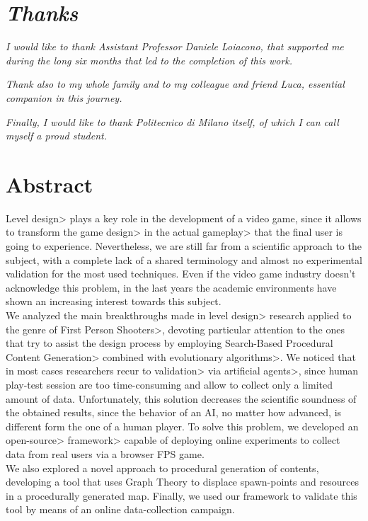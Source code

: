 \chapter{\textit{Thanks}}

\textit{I would like to thank Assistant Professor Daniele Loiacono, that supported me during the long six months that led to the completion of this work.}

\par \mbox{}

\textit{Thank also to my whole family and to my colleague and friend Luca, essential companion in this journey.}

\par \mbox{}

\textit{Finally, I would like to thank Politecnico di Milano itself, of which I can call myself a proud student.}

\par \mbox{}

\textit{}

\chapter{Abstract}

\<Level design> plays a key role in the development of a video game, since it allows to transform the \<game design> in the actual \<gameplay> that the final user is going to experience. Nevertheless, we are still far from a scientific approach to the subject, with a complete lack of a shared terminology and almost no experimental validation for the most used techniques. Even if the video game industry doesn't acknowledge this problem, in the last years the academic environments have shown an increasing interest towards this subject. \\
We analyzed the main breakthroughs made in \<level design> research applied to the genre of \<First Person Shooters>, devoting particular attention to the ones that try to assist the design process by employing \<Search-Based Procedural Content Generation> combined with \<evolutionary algorithms>. We noticed that in most cases researchers recur to \<validation> via \<artificial agents>, since human play-test session are too time-consuming and allow to collect only a limited amount of data. Unfortunately, this solution decreases the scientific soundness of the obtained results, since the behavior of an AI, no matter how advanced, is different form the one of a human player. To solve this problem, we developed an \<open-source> \<framework> capable of deploying online experiments to collect data from real users via a browser FPS game. \\
We also explored a novel approach to procedural generation of contents, developing a tool that uses Graph Theory to displace spawn-points and resources in a procedurally generated map. Finally, we used our framework to validate this tool by means of an online data-collection campaign. 


